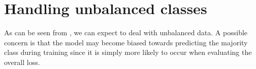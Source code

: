 \documentclass[
	fontsize=10pt, %
	twoside=false, %
	secnumdepth=1, %
  toc=indentunnumbered %
]{kaobook}
\begin{document}







\section{Handling unbalanced classes}





As can be seen from , we can expect to deal with unbalanced
data. 
A possible concern is that the model may become biased towards predicting
the majority class during training since it is simply more likely to occur when
evaluating the overall loss.
\end{document}
